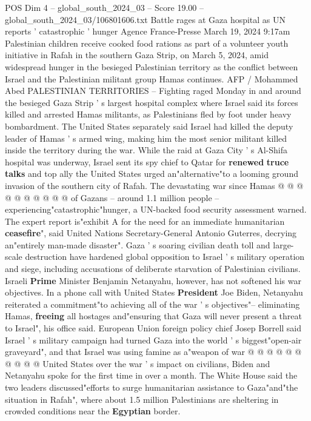 \begin{textsample}{POS Dim 4 – global\_south\_2024\_03 – Score 19.00 – global\_south\_2024\_03/106801606.txt}  \label{ex:f4_pos_107}
Battle rages at Gaza hospital as UN reports ' catastrophic ' hunger Agence France-Presse March 19, 2024 9:17am Palestinian children receive cooked food rations as part of a volunteer youth initiative in Rafah in the southern Gaza Strip, on March 5, 2024, amid widespread hunger in the besieged Palestinian territory as the conflict between Israel and the Palestinian militant group Hamas continues.
AFP / Mohammed Abed PALESTINIAN TERRITORIES -- Fighting raged Monday in and around the besieged Gaza Strip ' s largest hospital complex where Israel said its forces killed and arrested Hamas militants, as Palestinians fled by foot under heavy bombardment.
The United States separately said Israel had killed the deputy leader of Hamas ' s armed wing, making him the most senior militant killed inside the territory during the war.
While the raid at Gaza City ' s Al-Shifa hospital was underway, Israel sent its spy chief to Qatar for \textbf{renewed} \textbf{truce} \textbf{talks} and top ally the United States urged an"alternative"to a looming ground invasion of the southern city of Rafah.
The devastating war since Hamas @ @ @ @ @ @ @ @ @ @ of Gazans -- around 1.1 million people -- experiencing"catastrophic"hunger, a UN-backed food security assessment warned.
The expert report is"exhibit A for the need for an immediate humanitarian \textbf{ceasefire}", said United Nations Secretary-General Antonio Guterres, decrying an"entirely man-made disaster".
Gaza ' s soaring civilian death toll and large-scale destruction have hardened global opposition to Israel ' s military operation and siege, including accusations of deliberate starvation of Palestinian civilians.
Israeli \textbf{Prime} Minister Benjamin Netanyahu, however, has not softened his war objectives.
In a phone call with United States \textbf{President} Joe Biden, Netanyahu reiterated a commitment"to achieving all of the war ' s objectives"-- eliminating Hamas, \textbf{freeing} all hostages and"ensuring that Gaza will never present a threat to Israel", his office said.
European Union foreign policy chief Josep Borrell said Israel ' s military campaign had turned Gaza into the world ' s biggest"open-air graveyard", and that Israel was using famine as a"weapon of war @ @ @ @ @ @ @ @ @ @ United States over the war ' s impact on civilians, Biden and Netanyahu spoke for the first time in over a month.
The White House said the two leaders discussed"efforts to surge humanitarian assistance to Gaza"and"the situation in Rafah", where about 1.5 million Palestinians are sheltering in crowded conditions near the \textbf{Egyptian} border.

\end{textsample}
